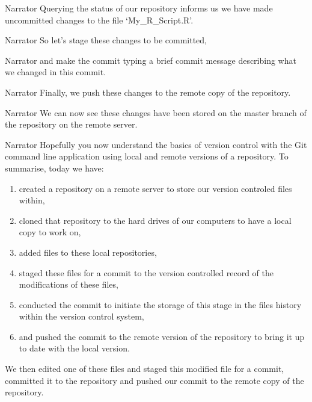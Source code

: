 \documentclass{screenplay} %
\begin{document}
\begin{dialogue}{Narrator}
Querying the status of our repository informs us we have made uncommitted changes to the file `My\_R\_Script.R'.
\end{dialogue}

\begin{dialogue}{Narrator}
So let's stage these changes to be committed,
\end{dialogue}

\begin{dialogue}{Narrator}
and make the commit typing a brief commit message describing what we changed in this commit.
\end{dialogue}

\begin{dialogue}{Narrator}
Finally, we push these changes to the remote copy of the repository.
\end{dialogue}

\begin{dialogue}{Narrator}
We can now see these changes have been stored on the master branch of the repository on the remote server.
\end{dialogue}

\begin{dialogue}{Narrator}
Hopefully you now understand the basics of version control with the Git command line application using local and remote versions of a repository. %
To summarise, today we have: \begin{enumerate} 
\item created a repository on a remote server to store our version controled files within, 
\item cloned that repository to the hard drives of our computers to have a local copy to work on, 
\item added files to these local repositories, 
\item staged these files for a commit to the version controlled record of the modifications of these files,
\item conducted the commit to initiate the storage of this stage in the files history within the version control system,
\item and pushed the commit to the remote version of the repository to bring it up to date with the local version.
\end{enumerate}
We then edited one of these files and staged this modified file for a commit, committed it to the repository and pushed our commit to the remote copy of the repository.
\end{dialogue}
\end{document}
